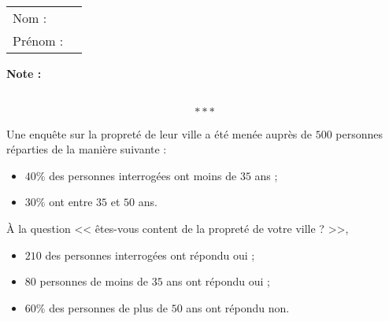 \documentclass[10pt,french]{article}
\newcommand\competences{
\setcounter{exo}{0}\renewcommand\arraystretch{1.2}
\begin{tabular}{ll} Nom : \\[5pt] Prénom : \end{tabular}
\hfill
\textbf{Note :}
\begin{tabular}{|c|}
\hline
\slashbox{\Huge\bfseries\phantom{10}}{\Huge\bfseries 10}\\
\hline
\end{tabular}\renewcommand\arraystretch{1}
\[***\]
}
\begin{document}
\clearpage


\competences


\exo Une enquête sur la propreté de leur ville a été menée auprès de $500$ personnes réparties de la manière suivante :
\begin{itemize}
    \item $40\%$ des personnes interrogées ont moins de $35$ ans ;
    \item $30\%$ ont entre $35$ et $50$ ans.
\end{itemize}

À la question << êtes-vous content de la propreté de votre ville  ? >>,
    \begin{itemize}
        \item $210$ des personnes interrogées ont répondu oui ;
        \item $80$ personnes de moins de $35$ ans ont répondu oui ;
        \item $60\%$ des personnes de plus de $50$ ans ont répondu non.
    \end{itemize}
\end{document}
